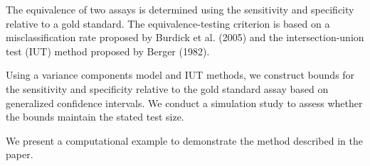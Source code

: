\documentclass[MAIN.tex]{subfiles}
\begin{document}

The equivalence of two assays is determined using the sensitivity and specificity relative to a gold standard.
The equivalence-testing criterion is based on a misclassification rate proposed by Burdick et al. (2005) and
the intersection-union test (IUT) method proposed by Berger (1982). 

Using a variance components model and IUT methods, we construct bounds for the sensitivity and specificity 
relative to the gold standard assay based on generalized confidence intervals. We conduct a simulation study 
to assess whether the bounds maintain the stated test size. 

We present a computational example to demonstrate the method described in the paper.


\end{document}
